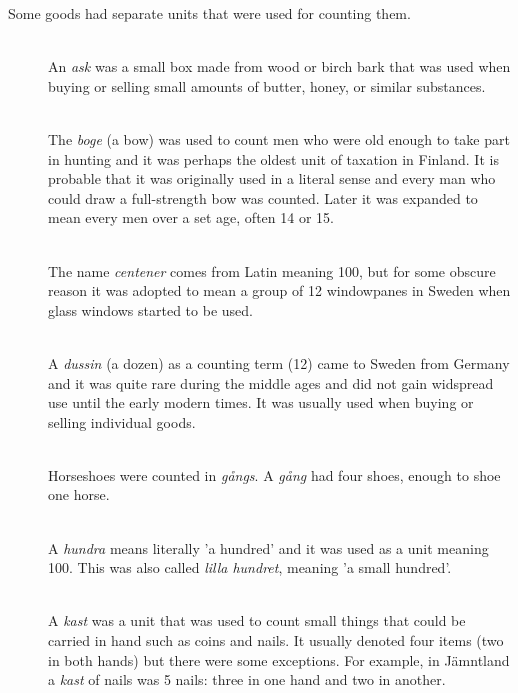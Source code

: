 \documentclass[a4paper]{article}
\newcommand{\samplefont}{\fontsize{16}{16}\abcursivefamily\spaceskip0.2em}
\newcommand{\sample}[1]{{\samplefont #1 \strut}}
\begin{document}
Some goods had separate units that were used for counting them. 

\begin{description}

\item [\sample{ask} \emph{ask}, \emph{aski}] \mbox{} \\
  An \emph{ask} was a small box made from wood or birch bark that was
  used when buying or selling small amounts of butter, honey, or
  similar substances. 

\item [\sample{boge}, \sample{b} \emph{boge}, \emph{jousi}] \mbox{} \\
  The \emph{boge} (a bow) was used to count men who were old enough to
  take part in hunting and it was perhaps the oldest unit of taxation
  in Finland. It is probable that it was originally used in a literal
  sense and every man who could draw a full-strength bow was counted.
  Later it was expanded to mean every men over a set age, often 14 or
  15.


\item [\sample{sintener} \emph{centener} ] \mbox{} \\
  The name \emph{centener} comes from Latin meaning 100, but for some
  obscure reason it was adopted to mean a group of 12 windowpanes in
  Sweden when glass windows started to be used. 

\item [\sample{dussin} \emph{dussin}, \emph{tusina}] \mbox{} \\
  A \emph{dussin} (a dozen) as a counting term (12) came to Sweden from
  Germany and it was quite rare during the middle ages and did not
  gain widspread use until the early modern times. It was usually used
  when buying or selling individual goods.

\item [\sample{gaang} \emph{gång}, \emph{kerta}] \mbox{} \\
  Horseshoes were counted in \emph{gångs}. A \emph{gång} had four
  shoes, enough to shoe one horse.

\item [\sample{hundra} \emph{hundra}] \mbox{} \\
  A \emph{hundra} means literally 'a hundred' and it was used as a
  unit meaning 100. This was also called \emph{lilla hundret}, meaning
  'a small hundred'.
  
\item [\sample{kast} \emph{kast}] \mbox{} \\
  A \emph{kast} was a unit that was used to count small things that
  could be carried in hand such as coins and nails. It usually denoted
  four items (two in both hands) but there were some exceptions. For
  example, in Jämntland a \emph{kast} of nails was 5 nails: three in
  one hand and two in another. 


\end{description}
\end{document}
